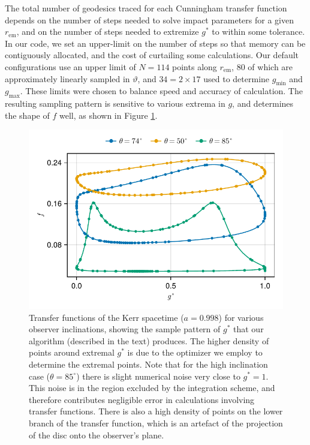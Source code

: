 \documentclass[fleqn,usenatbib]{mnras}
\begin{document}
The total number of geodesics traced for each Cunningham transfer function
depends on the number of steps needed to solve impact parameters for a given
$r_\text{em}$, and on the number of steps needed to extremize $g^\ast$ to within
some tolerance. In our code, we set an upper-limit on the number of steps so
that memory can be contiguously allocated, and the cost of curtailing some
calculations. Our default configurations use an upper limit of $N = 114$ points
along $r_\text{em}$, $80$ of which are approximately linearly sampled in
$\vartheta$, and $34 = 2 \times 17$ used to determine $g_\text{min}$ and
$g_\text{max}$. These limits were chosen to balance speed and accuracy of
calculation. The resulting sampling pattern is sensitive to various extrema in
$g$, and determines the shape of $f$ well, as shown in Figure
\ref{fig:transfer-sampling-pattern}.

\begin{figure}
    \centering
    \includegraphics[width=0.95\linewidth]{figures/transfer-functions.sampling.pdf}
    \caption{Transfer functions of the Kerr spacetime ($a = 0.998$) for various
        observer inclinations, showing the sample pattern of $g^\ast$ that our
        algorithm (described in the text) produces. The higher
        density of points around extremal $g^\ast$ is due to the optimizer we
        employ to determine the extremal points. Note that for the high
        inclination case ($\theta = 85^\circ$) there is slight numerical noise
        very close to $g^\ast = 1$. This noise is in the region excluded by the
        integration scheme, and therefore contributes negligible error in
        calculations involving transfer functions. There is also a high density
        of points on the lower branch of the transfer function, which is an
        artefact of the projection of the disc onto the observer's plane.
    }
    \label{fig:transfer-sampling-pattern}
\end{figure}
\end{document}
